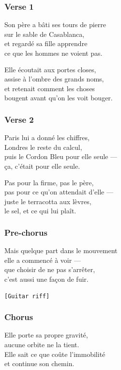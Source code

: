 \documentclass[]{article}
\begin{document}
\subsubsection{Verse 1}\label{verse-1-5}

Son père a bâti ses tours de pierre\\
sur le sable de Casablanca,\\
et regardé sa fille apprendre\\
ce que les hommes ne voient pas.

Elle écoutait aux portes closes,\\
assise à l'ombre des grands noms,\\
et retenait comment les choses\\
bougent avant qu'on les voit bouger.

\subsubsection{Verse 2}\label{verse-2-2}

Paris lui a donné les chiffres,\\
Londres le reste du calcul,\\
puis le Cordon Bleu pour elle seule ---\\
ça, c'était pour elle seule.

Pas pour la firme, pas le père,\\
pas pour ce qu'on attendait d'elle ---\\
juste le terracotta aux lèvres,\\
le sel, et ce qui lui plaît.

\subsubsection{Pre-chorus}\label{pre-chorus-2}

Mais quelque part dans le mouvement\\
elle a commencé à voir ---\\
que choisir de ne pas s'arrêter,\\
c'est aussi une façon de fuir.

\texttt{{[}Guitar\ riff{]}}

\subsubsection{Chorus}\label{chorus-8}

Elle porte sa propre gravité,\\
aucune orbite ne la tient.\\
Elle sait ce que coûte l'immobilité\\
et continue son chemin.
\end{document}
